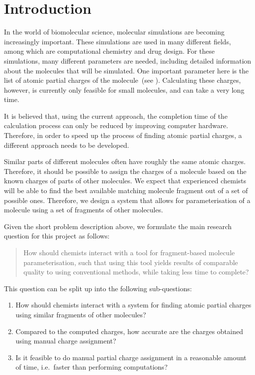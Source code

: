 \chapter{Introduction}

In the world of biomolecular science, molecular simulations are becoming increasingly important. These simulations are used in many different fields, among which are computational chemistry and drug design. For these simulations, many different parameters are needed, including detailed information about the molecules that will be simulated. One important parameter here is the list of atomic partial charges of the molecule~(see ). Calculating these charges, however, is currently only feasible for small molecules, and can take a very long time.

It is believed that, using the current approach, the completion time of the calculation process can only be reduced by improving computer hardware. Therefore, in order to speed up the process of finding atomic partial charges, a different approach needs to be developed.

Similar parts of different molecules often have roughly the same atomic charges. Therefore, it should be possible to assign the charges of a molecule based on the known charges of parts of other molecules. We expect that experienced chemists will be able to find the best available matching molecule fragment out of a set of possible ones. Therefore, we design a system that allows for parameterisation of a molecule using a set of fragments of other molecules.

Given the short problem description above, we formulate the main research question for this project as follows:
\begin{quote}
How should chemists interact with a tool for fragment-based molecule parameterisation, such that using this tool yields results of comparable quality to using conventional methods, while taking less time to complete?
\end{quote}

This question can be split up into the following sub-questions:
\begin{enumerate}
\item How should chemists interact with a system for finding atomic partial charges using similar fragments of other molecules?
\item Compared to the computed charges, how accurate are the charges obtained using manual charge assignment?
\item Is it feasible to do manual partial charge assignment in a reasonable amount of time, i.e.\ faster than performing computations?
\end{enumerate}

